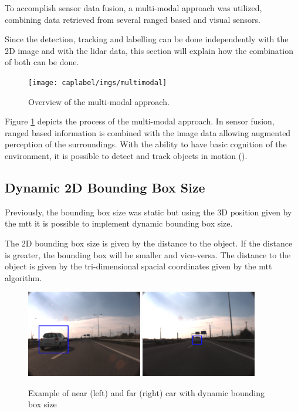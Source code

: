 To accomplish sensor data fusion, a multi-modal approach was utilized, combining data retrieved from several ranged based and visual sensors.

Since the detection, tracking and labelling can be done independently with the 2D image and with the \gls{lidar} data, this section will explain how the combination of both can be done.

\begin{figure}[htp]
	
	\centering
	\texttt{[image: caplabel/imgs/multimodal]}
	
	\caption{Overview of the multi-modal approach. }
	\label{fig:multimodal}
	
\end{figure}

Figure \ref{fig:multimodal} depicts the process of the multi-modal approach. In sensor fusion, ranged based information is combined with the image data allowing augmented perception of the surroundings. With the ability to have basic cognition of the environment, it is possible to detect and track objects in motion (\cite{Spinello2010}).

\subsection{Dynamic 2D Bounding Box Size}

Previously, the bounding box size was static but using the 3D position given by the \gls{mtt} it is possible to implement dynamic bounding box size.

The 2D bounding box size is given by the distance to the object. If the distance is greater, the bounding box will be smaller and vice-versa. The distance to the object is given by the tri-dimensional spacial coordinates given by the \gls{mtt} algorithm.

\begin{figure}[htp]
	
	\centering
	\includegraphics[width=0.45\textwidth]{caplabel/imgs/boxds1.png}
	\includegraphics[width=0.45\textwidth]{caplabel/imgs/boxds2.png}
	
	\caption{Example of near (left) and far (right) car with dynamic bounding box size}
	\label{fig:dsize}
	
\end{figure}

